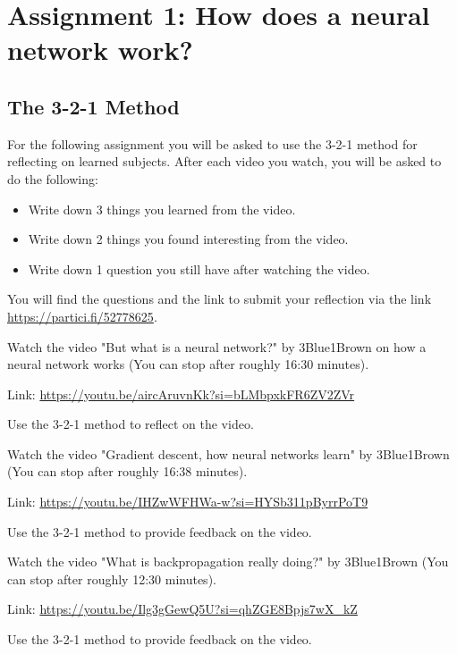 \documentclass[12pt,a4paper]{report}
\begin{document}
\section*{Assignment 1: How does a neural network work?}

\subsection*{The 3-2-1 Method}
For the following assignment you will be asked to use the 3-2-1 method for reflecting on learned subjects. After each video you watch, you will be asked to do the following:
\begin{itemize}
    \item Write down 3 things you learned from the video.
    \item Write down 2 things you found interesting from the video.
    \item Write down 1 question you still have after watching the video.
\end{itemize}

You will find the questions and the link to submit your reflection via the link \url{https://partici.fi/52778625}.


\begin{ex}
     Watch the video "But what is a neural network?" by 3Blue1Brown on how a neural network works (You can stop after roughly 16:30 minutes).
     
     Link: \url{https://youtu.be/aircAruvnKk?si=bLMbpxkFR6ZV2ZVr}

     Use the 3-2-1 method to reflect on the video. 

\end{ex}
\begin{ex}
     Watch the video "Gradient descent, how neural networks learn" by 3Blue1Brown (You can stop after roughly 16:38 minutes).
     
     Link: \url{https://youtu.be/IHZwWFHWa-w?si=HYSb311pByrrPoT9}

     Use the 3-2-1 method to provide feedback on the video.

\end{ex}
\begin{ex}
     Watch the video "What is backpropagation really doing?" by 3Blue1Brown (You can stop after roughly 12:30 minutes).
     
     Link: \url{https://youtu.be/Ilg3gGewQ5U?si=qhZGE8Bpjs7wX_kZ}

     Use the 3-2-1 method to provide feedback on the video.

\end{ex}
\end{document}
